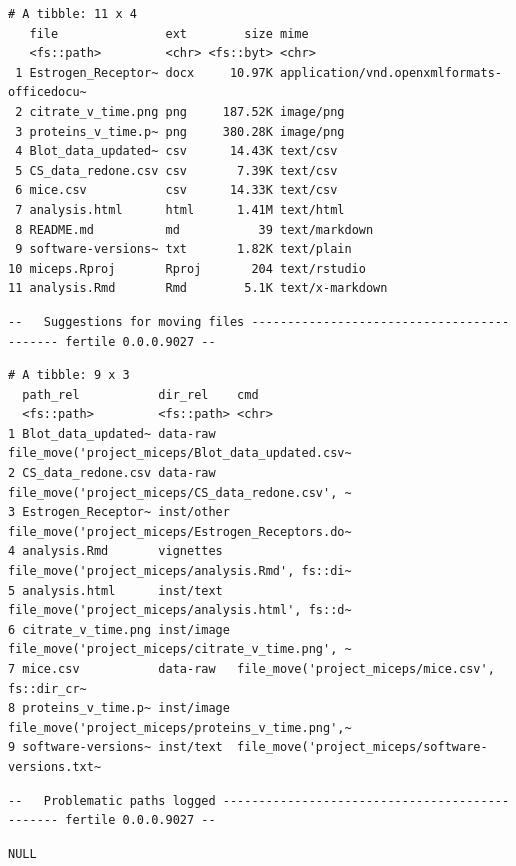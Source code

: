 \documentclass[12pt,twoside]{reedthesis}
\begin{document}
\begin{verbatim}
# A tibble: 11 x 4
   file               ext        size mime                                      
   <fs::path>         <chr> <fs::byt> <chr>                                     
 1 Estrogen_Receptor~ docx     10.97K application/vnd.openxmlformats-officedocu~
 2 citrate_v_time.png png     187.52K image/png                                 
 3 proteins_v_time.p~ png     380.28K image/png                                 
 4 Blot_data_updated~ csv      14.43K text/csv                                  
 5 CS_data_redone.csv csv       7.39K text/csv                                  
 6 mice.csv           csv      14.33K text/csv                                  
 7 analysis.html      html      1.41M text/html                                 
 8 README.md          md           39 text/markdown                             
 9 software-versions~ txt       1.82K text/plain                                
10 miceps.Rproj       Rproj       204 text/rstudio                              
11 analysis.Rmd       Rmd        5.1K text/x-markdown                           
\end{verbatim}
\begin{verbatim}
--   Suggestions for moving files ------------------------------------------- fertile 0.0.0.9027 --
\end{verbatim}
\begin{verbatim}
# A tibble: 9 x 3
  path_rel           dir_rel    cmd                                             
  <fs::path>         <fs::path> <chr>                                           
1 Blot_data_updated~ data-raw   file_move('project_miceps/Blot_data_updated.csv~
2 CS_data_redone.csv data-raw   file_move('project_miceps/CS_data_redone.csv', ~
3 Estrogen_Receptor~ inst/other file_move('project_miceps/Estrogen_Receptors.do~
4 analysis.Rmd       vignettes  file_move('project_miceps/analysis.Rmd', fs::di~
5 analysis.html      inst/text  file_move('project_miceps/analysis.html', fs::d~
6 citrate_v_time.png inst/image file_move('project_miceps/citrate_v_time.png', ~
7 mice.csv           data-raw   file_move('project_miceps/mice.csv', fs::dir_cr~
8 proteins_v_time.p~ inst/image file_move('project_miceps/proteins_v_time.png',~
9 software-versions~ inst/text  file_move('project_miceps/software-versions.txt~
\end{verbatim}
\begin{verbatim}
--   Problematic paths logged ----------------------------------------------- fertile 0.0.0.9027 --
\end{verbatim}
\begin{verbatim}
NULL
\end{verbatim}
\normalsize
\end{document}
